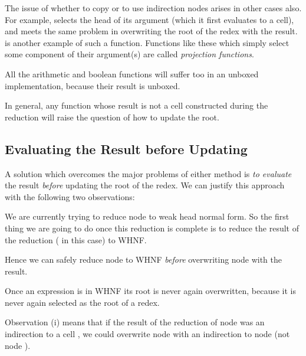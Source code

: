 The issue of whether to copy or to use indirection nodes arises in other cases
also. For example,  selects the head of its argument (which it first
evaluates to a  cell), and meets the same problem in overwriting the root
of the redex with the result.  is another example of such a function.
Functions like these which simply select some component of their
argument(s) are called \textit{projection functions}.

All the arithmetic and boolean functions will suffer too in an unboxed
implementation, because their result is unboxed.

In general, any function whose result is not a cell constructed during the
reduction will raise the question of how to update the root.

\subsection{Evaluating the Result before Updating}

A solution which overcomes the major problems of either method is \textit{to
    evaluate} the result \textit{before} updating the root of the redex. We can justify this
approach with the following two observations:

\begin{numbered}
    \item We are currently trying to reduce node \ml{\$} to weak head normal form. So
    the first thing we are going to do once this reduction is complete is to
    reduce the result of the reduction ( in this case) to WHNF.

    \phantom{XX} Hence we can safely reduce node \ml{\#} to WHNF \textit{before} overwriting node
    \ml{\$} with the result.

    \item Once an expression is in WHNF its root is never again overwritten,
    because it is never again selected as the root of a redex.
\end{numbered}
Observation (i) means that if the result of the reduction of node \ml{\#} was an
indirection to a  cell \ml{*}, we could overwrite node \ml{\$} with an indirection to
node \ml{*} (not node \ml{\#}).

